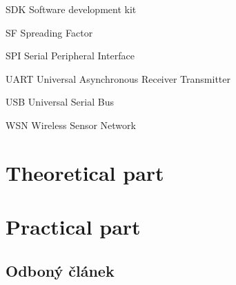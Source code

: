 \documentclass[oneside]{ctuthesis}
\theoremstyle{plain}
\theoremstyle{definition}
\theoremstyle{note}
\newcommand{\abbrlabel}[1]{\makebox[3cm][l]{\textbf{#1}\ \dotfill}}
\newenvironment{abbreviations}{\begin{list}{}{\renewcommand{\makelabel}{\abbrlabel}}}{\end{list}}
\begin{document}
\begin{abbreviations}
	\item[SDK]	 	Software development kit
	\item[SF]		Spreading Factor
	\item[SPI]   	Serial Peripheral Interface 
	\item[UART]		Universal Asynchronous Receiver Transmitter 
	\item[USB]		Universal Serial Bus 
	\item[WSN]		Wireless Sensor Network

\end{abbreviations}

\setcounter{secnumdepth}{1} %




\part{Theoretical part}
									



\part{Practical part}










\appendix

\chapter{Odboný článek}













\end{document}
